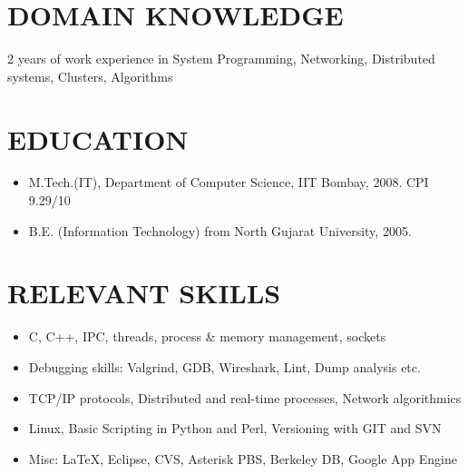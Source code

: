 \documentclass{res}
\begin{document}
\begin{resume}

					 \section{DOMAIN KNOWLEDGE}

					 2 years of work experience in System Programming, Networking, Distributed systems, Clusters, Algorithms 
					  
					  \section{EDUCATION}
					  \begin{itemize}
					  \item M.Tech.(IT), Department of Computer Science, IIT Bombay, 2008. CPI 9.29/10 
					  \item B.E. (Information Technology) from North Gujarat University, 2005. 
					  \end{itemize}

					  \section{RELEVANT SKILLS}

					  \begin{itemize}
					  \item C, C++, IPC, threads, process \& memory management, sockets
				          \item Debugging skills: Valgrind, GDB, Wireshark, Lint, Dump analysis etc.
					  \item TCP/IP protocols, Distributed and real-time processes, Network algorithmics
                                          \item Linux, Basic Scripting in Python and Perl, Versioning with GIT and SVN
					  \item Misc: \LaTeX, Eclipse, CVS, Asterisk PBS, Berkeley DB, Google App Engine 
					  \end{itemize}


\end{resume}
\end{document}
